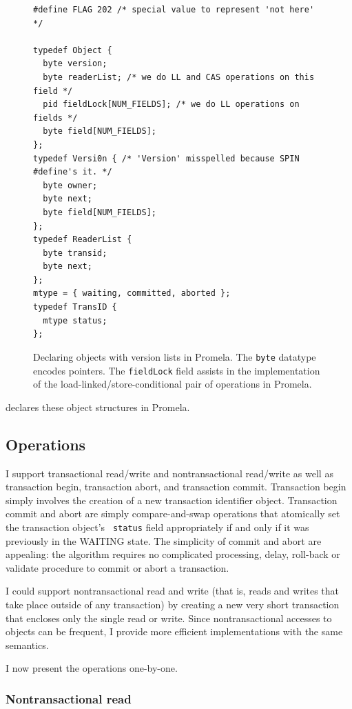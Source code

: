 \begin{figure}
\sis\fontsize{9}{10}
\begin{verbatim}
#define FLAG 202 /* special value to represent 'not here' */

typedef Object {
  byte version;
  byte readerList; /* we do LL and CAS operations on this field */
  pid fieldLock[NUM_FIELDS]; /* we do LL operations on fields */
  byte field[NUM_FIELDS];
};
typedef Versi0n { /* 'Version' misspelled because SPIN #define's it. */
  byte owner;
  byte next;
  byte field[NUM_FIELDS];
};
typedef ReaderList {
  byte transid;
  byte next;
};
mtype = { waiting, committed, aborted };
typedef TransID {
  mtype status;
};
\end{verbatim}
\caption[Declaring objects with version lists in Promela.]
 {Declaring objects with version lists in Promela.
  The \texttt{byte} datatype encodes pointers.
  The \texttt{fieldLock} field assists in the implementation of the
  load-linked/store-conditional pair of operations in Promela.}
\label{fig:promdecl}
\end{figure}

 declares these object structures in Promela.

\subsection{Operations}%
I support transactional read/write and nontransactional read/write
as well as transaction begin, transaction abort, and transaction
commit.  Transaction begin simply involves the creation of a new
transaction identifier object.  Transaction commit and abort are simply
compare-and-swap operations that atomically set the transaction object's {\tt
  status} field appropriately if and only if it was previously in the
WAITING state.
The simplicity of commit and abort are appealing: the \apex algorithm
requires no complicated processing, delay, roll-back or validate
procedure to commit or abort a transaction.

I could support nontransactional read and write (that is,
reads and writes that take place outside of any transaction) by
creating a new very short transaction that encloses only the single
read or write.  Since nontransactional accesses to objects can be
frequent, I provide more efficient implementations with
the same semantics.

I now present the operations one-by-one.

\subsubsection{Nontransactional read}

